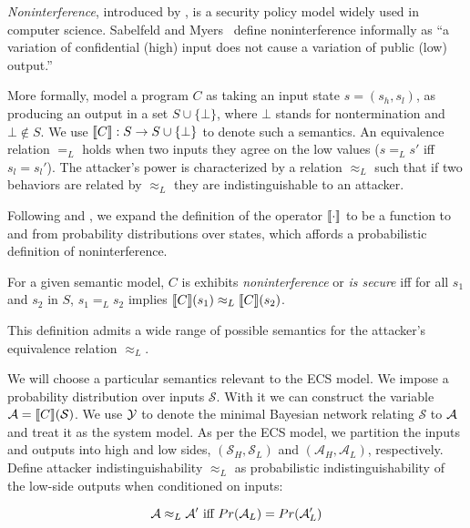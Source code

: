 \documentclass[../thesis.tex]{subfiles}
\begin{document}
\emph{Noninterference}, introduced by \cite{gm82security},
is a security policy model widely used in computer science.
Sabelfeld and Myers~\cite{sabelfeld03journal} define noninterference
informally as ``a variation of confidential (high)
input does not cause a variation of public (low) output.''

More formally, model a program $C$ as taking an
input state $s = (s_h,s_l)$,
as producing an output in a set $S \cup \{ \bot \}$,
where
$\bot$ stands for nontermination
and $\bot \notin S$.
We use $\llbracket C\rrbracket  : S \rightarrow S \cup \{ \bot \}$
to denote such a semantics.
An equivalence relation $=_L$ holds when
two inputs they agree on the low values ($s=_Ls'$ iff
$s_l = s_l'$). The attacker's power is characterized
by a relation $\approx_L$ such that if two behaviors
are related by $\approx_L$ they are indistinguishable
to an attacker. 

Following \citet{tschantz15csf} and \citet{datta2017use},
we expand the definition of the operator $\llbracket \cdot\rrbracket $
to be a function to and from probability distributions
over states, which affords a probabilistic definition
of noninterference.

\begin{dfn}
For a given semantic model, $C$ is
  exhibits \emph{noninterference} or \emph{is secure} iff for all $s_1$ and $s_2$ in $S$, $s_1 =_L s_2$ implies $\llbracket C\rrbracket(s_1) \approx_L \llbracket C\rrbracket(s_2)$.
\end{dfn}

This definition admits a wide range of possible semantics for
the attacker's equivalence relation $\approx_L$.

We will choose a particular semantics relevant
to the ECS model.
We impose a probability distribution over inputs
$\mathcal{S}$.
With it we can construct the variable 
$\mathcal{A} = \llbracket C\rrbracket(\mathcal{S})$.
We use $\mathcal{Y}$ to denote the minimal Bayesian network relating
$\mathcal{S}$ to $\mathcal{A}$ and treat it as the system model.
As per the ECS model, we partition the inputs
and outputs into high and low sides,
$(\mathcal{S}_H, \mathcal{S}_L)$ and
$(\mathcal{A}_H, \mathcal{A}_L)$,
respectively.
Define attacker indistinguishability $\approx_L$
as probabilistic indistinguishability of the low-side outputs when
conditioned on inputs:

\begin{dfn}
  $$\mathcal{A} \approx_L \mathcal{A}' \text{ iff } Pr(\mathcal{A}_L) = Pr
  (\mathcal{A}_L')$$
\end{dfn}
\end{document}
